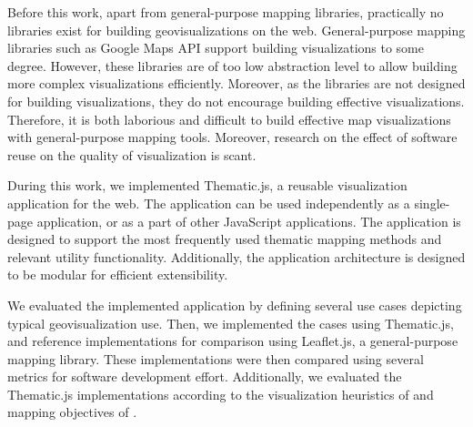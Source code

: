 
Before this work, apart from general-purpose mapping libraries, practically no libraries exist for building geovisualizations on the web. General-purpose mapping libraries such as Google Maps API support building visualizations to some degree. However, these libraries are of too low abstraction level to allow building more complex visualizations efficiently. Moreover, as the libraries are not designed for building visualizations, they do not encourage building effective visualizations. Therefore, it is both laborious and difficult to build effective map visualizations with general-purpose mapping tools. Moreover, research on the effect of software reuse on the quality of visualization is scant.

During this work, we implemented Thematic.js, a reusable visualization application for the web. The application can be used independently as a single-page application, or as a part of other JavaScript applications. The application is designed to support the most frequently used thematic mapping methods and relevant utility functionality. Additionally, the application architecture is designed to be modular for efficient extensibility.

We evaluated the implemented application by defining several use cases depicting typical geovisualization use. Then, we implemented the cases using Thematic.js, and reference implementations for comparison using Leaflet.js, a general-purpose mapping library. These implementations were then compared using several metrics for software development effort. Additionally, we evaluated the Thematic.js implementations according to the visualization heuristics of \citet{zuk_heuristics_2006} and mapping objectives of \citet{schlichtmann_visualization_2002}.


